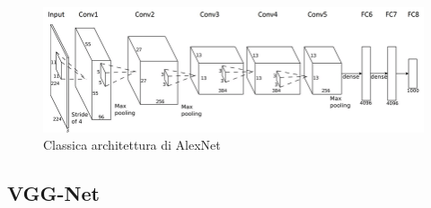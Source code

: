 \begin{figure}[H]
    \centering
    \includegraphics[width=1\textwidth]{Immagini/Generiche/AlexNet.png}
    \caption{Classica architettura di AlexNet}
    \label{fig:AlexNet}
\end{figure}

\subsection{VGG-Net}